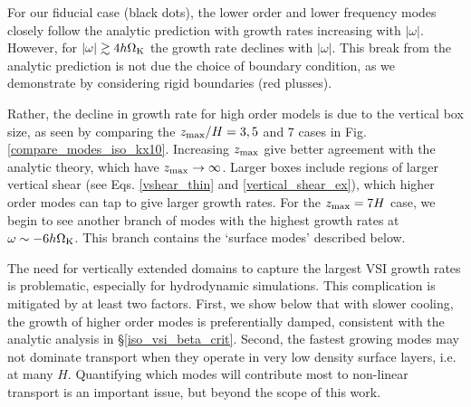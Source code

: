 For our fiducial case (black dots), the lower order and lower
frequency modes closely follow the analytic prediction with growth
rates increasing with $|\omega|$. %
However, for $|\omega| \gtrsim 4 h \Omega_{\rm K}$ the growth rate declines with
$|\omega|$.  This break from the analytic prediction is not due the
choice of boundary condition, as we demonstrate by considering rigid
boundaries (red plusses). 

Rather, the decline in growth rate for high order models is due to the
vertical box size, as seen by comparing the $z_\mathrm{max}/H = 3, 5$ and 7
cases in Fig. \ref{compare_modes_iso_kx10}. Increasing $z_\mathrm{max}$ give
better agreement with the analytic theory, which have $z_\mathrm{max} \to  
\infty$. Larger boxes include regions of larger vertical shear (see
Eqs. \ref{vshear_thin} and \ref{vertical_shear_ex}), which higher
order modes can tap to give larger growth rates. For the $z_\mathrm{max} = 7
H$ case, we begin to see another branch of modes with the highest
growth rates at $\omega \sim -6 h\Omega_{\rm K}$. This branch contains the
`surface modes' described below.   

The need for vertically extended domains to capture the largest VSI
growth rates is problematic, especially for hydrodynamic simulations.
This  complication is mitigated by at least two factors.  First, we
show below that with slower cooling, the growth of higher order modes
is preferentially damped, consistent with the analytic analysis in
\S\ref{iso_vsi_beta_crit}.  Second, the fastest growing modes may not
dominate transport when they operate in very low density  surface
layers, i.e. at many $H$. Quantifying which modes will contribute
most to non-linear transport is an important issue, but beyond the
scope of this work. 




